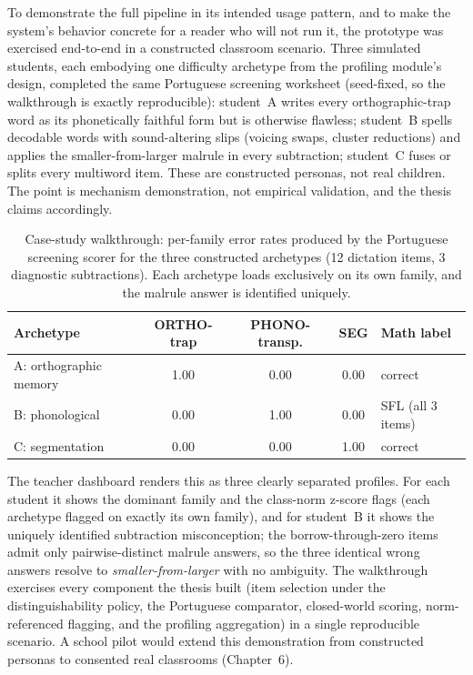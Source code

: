 To demonstrate the full pipeline in its intended usage pattern, and to make the system's behavior concrete for a reader who will not run it, the prototype was exercised end-to-end in a constructed classroom scenario. Three simulated students, each embodying one difficulty archetype from the profiling module's design, completed the same Portuguese screening worksheet (seed-fixed, so the walkthrough is exactly reproducible): student~A writes every orthographic-trap word as its phonetically faithful form but is otherwise flawless; student~B spells decodable words with sound-altering slips (voicing swaps, cluster reductions) and applies the smaller-from-larger malrule in every subtraction; student~C fuses or splits every multiword item. These are constructed personas, not real children. The point is mechanism demonstration, not empirical validation, and the thesis claims accordingly.

\begin{table}[ht]
\centering
\caption[Case-study walkthrough: per-family error rates for the three constructed archetypes.]{Case-study walkthrough: per-family error rates produced by the Portuguese screening scorer for the three constructed archetypes (12 dictation items, 3 diagnostic subtractions). Each archetype loads exclusively on its own family, and the malrule answer is identified uniquely.}
\label{tab:impl_casestudy}
\small\setlength{\tabcolsep}{4pt}
\begin{tabular}{lcccl}
\toprule
\textbf{Archetype} & \textbf{ORTHO-trap} & \textbf{PHONO-transp.} & \textbf{SEG} & \textbf{Math label} \\
\midrule
A: orthographic memory & 1.00 & 0.00 & 0.00 & correct \\
B: phonological        & 0.00 & 1.00 & 0.00 & SFL (all 3 items) \\
C: segmentation        & 0.00 & 0.00 & 1.00 & correct \\
\bottomrule
\end{tabular}
\end{table}

The teacher dashboard renders this as three clearly separated profiles. For each student it shows the dominant family and the class-norm z-score flags (each archetype flagged on exactly its own family), and for student~B it shows the uniquely identified subtraction misconception; the borrow-through-zero items admit only pairwise-distinct malrule answers, so the three identical wrong answers resolve to \emph{smaller-from-larger} with no ambiguity. The walkthrough exercises every component the thesis built (item selection under the distinguishability policy, the Portuguese comparator, closed-world scoring, norm-referenced flagging, and the profiling aggregation) in a single reproducible scenario. A school pilot would extend this demonstration from constructed personas to consented real classrooms (Chapter~6).

